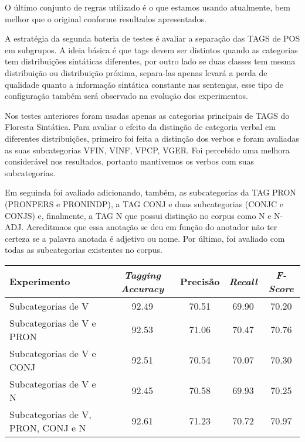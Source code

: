 O último conjunto de regras utilizado é o que estamos usando atualmente, bem melhor que o original conforme resultados apresentados. 

A estratégia da segunda bateria de testes é avaliar a separação das TAGS de POS em subgrupos. A ideia básica é que tags devem ser distintos quando as categorias tem distribuições sintáticas diferentes, por outro lado se duas classes tem mesma distribuição ou distribuição próxima, separa-las apenas levará a perda de qualidade quanto a informação sintática constante nas sentenças, esse tipo de configuração também será observado na evolução dos experimentos.

Nos testes anteriores foram usadas apenas as categorias principais de TAGS do Floresta Sintática. Para avaliar o efeito da distinção de categoria verbal em diferentes distribuições, primeiro foi feita a distinção dos verbos e foram avaliadas as suas subcategorias VFIN, VINF, VPCP, VGER. Foi percebido uma melhora considerável nos resultados, portanto mantivemos os verbos com suas subcategorias. 

Em seguinda foi avaliado adicionando, também, as subcategorias da TAG PRON (PRONPERS e PRONINDP), a TAG CONJ e duas subcategorias (CONJC e CONJS) e, finalmente, a TAG N que possui distinção no corpus como N e N-ADJ. Acreditmaos que essa anotação se deu em função do anotador não ter certeza se a palavra anotada é adjetivo ou nome. Por último, foi avaliado com todas as subcategorias existentes no corpus.

\begin{center}
   \footnotesize
	\begin{tabular}{|l|c|c|c|c|}
		\hline
		\textbf{Experimento} &  \textbf{\emph{Tagging Accuracy}} & \textbf{Precisão} & \textbf{\emph{Recall}} & \textbf{\emph{F-Score}} \\
		\hline
		Subcategorias de V & 92.49 & 70.51 & 69.90 & 70.20\\
		\hline		
		Subcategorias de V e PRON & 92.53 & 71.06 & 70.47 & 70.76\\
		\hline		
		Subcategorias de V e CONJ & 92.51 & 70.54 & 70.07 & 70.30\\
		\hline		
		Subcategorias de V e N & 92.45 & 70.58 & 69.93 & 70.25\\
		\hline
		Subcategorias de V, PRON, CONJ e N & 92.61 & 71.23 & 70.72 & 70.97\\
		\hline
	\end{tabular}
	\label{tab:segundo_experimento}
\end{center}

